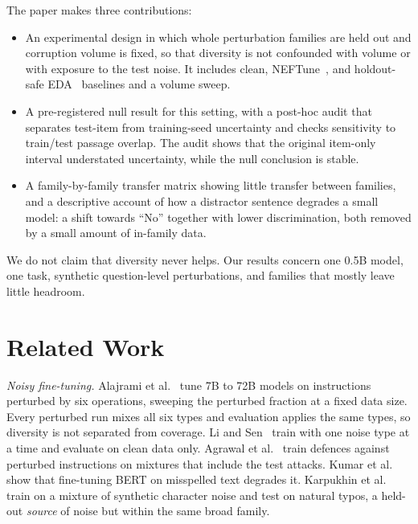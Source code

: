 \documentclass[conference]{IEEEtran}
\begin{document}
The paper makes three contributions:
\begin{itemize}
  \item An experimental design in which whole perturbation families are held out and corruption volume is fixed, so that diversity is not confounded with volume or with exposure to the test noise. It includes clean, NEFTune~\cite{jain2024neftune}, and holdout-safe EDA~\cite{wei2019eda} baselines and a volume sweep.
  \item A pre-registered null result for this setting, with a post-hoc audit that separates test-item from training-seed uncertainty and checks sensitivity to train/test passage overlap. The audit shows that the original item-only interval understated uncertainty, while the null conclusion is stable.
  \item A family-by-family transfer matrix showing little transfer between families, and a descriptive account of how a distractor sentence degrades a small model: a shift towards ``No'' together with lower discrimination, both removed by a small amount of in-family data.
\end{itemize}
We do not claim that diversity never helps. Our results concern one 0.5B model, one task, synthetic question-level perturbations, and families that mostly leave little headroom.

\section{Related Work}
\label{sec:related}

\textit{Noisy fine-tuning.} Alajrami et al.~\cite{alajrami2025noisy} tune 7B to 72B models on instructions perturbed by six operations, sweeping the perturbed fraction at a fixed data size. Every perturbed run mixes all six types and evaluation applies the same types, so diversity is not separated from coverage. Li and Sen~\cite{li2026analyzing} train with one noise type at a time and evaluate on clean data only. Agrawal et al.~\cite{agrawal2025enhancing} train defences against perturbed instructions on mixtures that include the test attacks. Kumar et al.~\cite{kumar2020noisy} show that fine-tuning BERT on misspelled text degrades it. Karpukhin et al.~\cite{karpukhin2019synthetic} train on a mixture of synthetic character noise and test on natural typos, a held-out \emph{source} of noise but within the same broad family.
\end{document}
